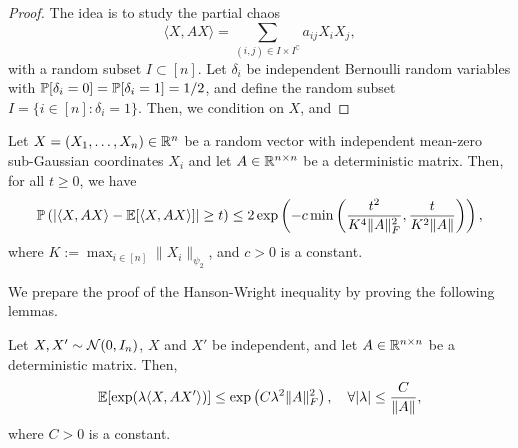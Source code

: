 \begin{proof}
	The idea is to study the partial chaos
	\begin{equation*}
		\langle X, AX\rangle=\sum_{(i,j)\in I\times I^{\complement}}a_{ij}X_{i}X_{j},
	\end{equation*}
	with a random subset \(I\subset[n]\). Let \(\delta_{i}\) be independent Bernoulli random variables with \(\mathbb{P}[\delta_{i}=0]=\mathbb{P}[\delta_{i}=1]=1/2\), and define the random subset \(I=\{i\in[n]:\delta_{i}=1\}\). Then, we condition on \(X\), and
\end{proof}

\begin{theorem}
	Let \(X=(X_{1},\ldots, X_{n})\in\mathbb{R}^{n}\) be a random vector with independent mean-zero sub-Gaussian coordinates \(X_{i}\) and let \(A\in\mathbb{R}^{n\times n}\) be a deterministic matrix. Then, for all \(t\geq0\), we have
	\begin{equation*}
		\mathbb{P}\left(\left|\langle X, AX\rangle-\mathbb{E}[\langle X, AX\rangle]\right|\geq t\right)\leq 2\exp\left(-c\min\left(\frac{t^2}{K^{4}\|A\|_{F}^{2}}, \frac{t}{K^{2}\|A\|}\right)\right),
	\end{equation*}
	where \(K:=\max_{i\in[n]}\|X_{i}\|_{\psi_{2}}\), and \(c>0\) is a constant.
\end{theorem}

We prepare the proof of the Hanson-Wright inequality by proving the following lemmas.

\begin{lemma}
	Let \(X,X'\sim\mathcal{N}(0, I_{n})\), \(X\) and \(X'\) be independent, and let \(A\in\mathbb{R}^{n\times n}\) be a deterministic matrix. Then,
	\begin{equation*}
		\mathbb{E}[\exp(\lambda\langle X, AX'\rangle)]\leq\exp\left(C\lambda^{2}\|A\|_{F}^{2}\right),\quad\forall|\lambda|\leq\frac{C}{\|A\|},
	\end{equation*}
	where \(C>0\) is a constant.
\end{lemma}

